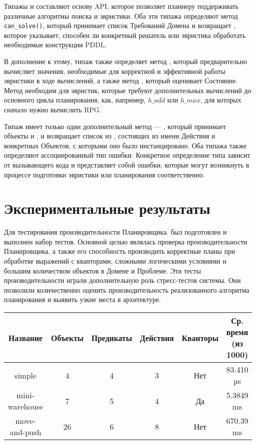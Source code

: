 Типажы  и  составляют основу API,
которое позволяет планнеру поддерживать различные алгоритмы поиска и эвристики.
Оба эти типажа определяют метод \texttt{can\_solve()},
который принимает список Требований Домена и возвращает ,
которое указывает, способен ли конкретный решатель или эвристика
обработать необходимые конструкции PDDL.

В дополнение к этому, типаж  также определяет метод ,
который предварительно вычисляет значения,
необходимые для корректной и эффективной работы эвристики в ходе вычислений,
а также метод , который оценивает Состояние.
Метод  необходим для эвристик,
которые требуют дополнительных вычислений до основного цикла планирования,
как, например, $h\_{add}$ или $h\_{max}$, 
для которых сначало нужно вычислить RPG.

Типаж  имеет только один дополнительный метод --- ,
который принимает объекты  и ,
и возвращает список из ,
состоящих из имени Действия и конкретных Объектов, с которыми оно было инстанцировано.
Оба типажа также определяют ассоциированный тип ошибки.
Конкретное определение типа зависит от вызывающего кода и представляет собой ошибки,
которые могут возникнуть в процессе подготовки эвристики или планирования соответственно.

\section{Экспериментальные результаты}

Для тестирования производительности Планировщика.
был подготовлен и выполнен набор тестов.
Основной целью являлась проверка производительности
Планировщика, а также его способность производить
корректные планы при обработке выражений с кванторами,
сложными логическими условиями и большим количеством объектов в Домене и Проблеме.
Эти тесты производительности играли дополнительную роль стресс-тестов системы.
Они позволили количественно оценить производительность
реализованного алгоритма планирования и выявить узкие места в архитектуре.

\begin{table}
  \centering
  \begin{footnotesize}
  \caption{Результаты тестов}
  \label{tab:benchresults}
    \begin{longtable}{|c|c|c|c|c|c|}
    \hline
      Название & Объекты & Предикаты & Действия & Кванторы & Ср. время (из 1000)\\
    \hline
    \hline
    simple & 4 & 4 & 3 & Нет & 83.410 µs\\
    \hline
    mini-warehouse & 7 & 5 & 4 & Да & 5.3849 ms\\
    \hline
    move-and-push & 26 & 6 & 8 & Нет & 670.39 ms\\
    \hline
  \end{longtable}
  \end{footnotesize}
\end{table}

